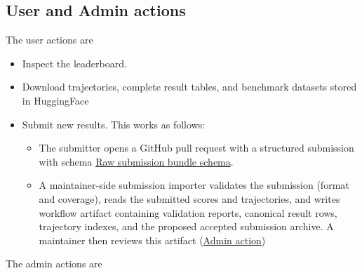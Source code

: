\documentclass[11pt]{article}
\begin{document}
\subsection*{User and Admin actions}
The user actions are
\begin{itemize}
\item Inspect the leaderboard.
\item Download trajectories, complete result tables, and benchmark datasets stored in HuggingFace
\item Submit new results. 
This works as follows:
\begin{itemize}
  \item The submitter opens a GitHub pull request with a structured submission with schema \hyperref[sec:website-raw-submission-bundle]{Raw submission bundle schema}.
  \item A maintainer-side submission importer validates the submission (format and coverage), reads the submitted scores and trajectories, and writes workflow artifact containing validation reports, canonical result rows, trajectory indexes, and the proposed accepted submission archive.
   A maintainer then reviews this artifact (\hyperref[sec:website-admin-review-submissions]{Admin action})

\end{itemize}
\end{itemize}
The admin actions are
\end{document}
